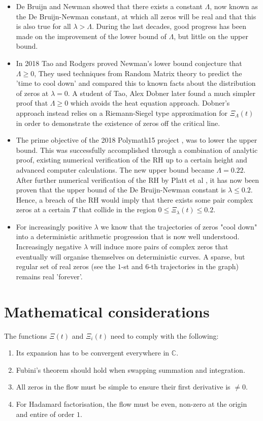 \documentclass[a4paper,11pt,twoside]{amsart}
\newcommand{\verifiedeq}{=}
\newcommand{\verifiedeq}{\stackrel{\checkmark}{=}}
\begin{document}
\begin{itemize}
  \item De Bruijn and Newman showed that there exists a constant $\Lambda$, now known as the De Bruijn-Newman constant, at which all zeros will be real and that this is also true for all $\lambda > \Lambda$. During the last decades, good progress has been made on the improvement of the lower bound of $\Lambda$, but little on the upper bound.
  \item In 2018 Tao and Rodgers \cite{rot} proved Newman's lower bound conjecture that $\Lambda \ge 0$, They used techniques from Random Matrix theory to predict the 'time to cool down' and compared this to known facts about the distribution of zeros at $\lambda = 0$. A student of Tao, Alex Dobner later found a much simpler proof \cite{dob} that $\Lambda \ge 0$ which avoids the heat equation approach. Dobner’s approach instead relies on a Riemann-Siegel type approximation for $\Xi_{\Lambda}(t)$ in order to demonstrate the existence of zeros off the critical line.
   \item The prime objective of the 2018 Polymath15 project \cite{pol}, was to lower the upper bound. This was successfully accomplished through a combination of analytic proof, existing numerical verification of the RH up to a certain height and advanced computer calculations. The new upper bound became $\Lambda \verifiedeq 0.22$. After further numerical verification of the RH by Platt et al \cite{pla}, it has now been proven that the upper bound of the De Bruijn-Newman constant is $\lambda \le 0.2$. Hence, a breach of the RH would imply that there exists some pair complex zeros at a certain $T$ that collide in the region $0 \le \Xi_{\lambda}(t) \le 0.2$.
  \item For increasingly positive $\lambda$ we know that the trajectories of zeros "cool down" into a deterministic arithmetic progression that is now well understood. Increasingly negative $\lambda$ will induce more pairs of complex zeros that eventually will organise themselves on deterministic curves. A sparse, but regular set of real zeros (see the $1$-st and $6$-th trajectories in the graph) remains real 'forever'. 
\end{itemize}

\pagebreak

\section{Mathematical considerations}\label{mathcons}
The functions $\Xi(t)$ and $\Xi_i(t)$ need to comply with the following:
\begin{enumerate}
\item Its expansion has to be convergent everywhere in $\mathbb{C}$.
\item Fubini's theorem should hold when swapping summation and integration.
\item All zeros in the flow must be simple to ensure their first derivative is $\ne 0$.
\item For Hadamard factorisation, the flow must be even, non-zero at the origin and entire of order $1$. 
\end{enumerate} 
\end{document}
